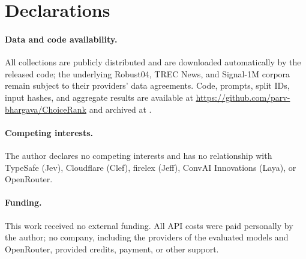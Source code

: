 \section*{Declarations}

\paragraph{Data and code availability.}
All collections are publicly distributed and are downloaded automatically by the released code; the underlying Robust04, TREC News, and Signal-1M corpora remain subject to their providers' data agreements. Code, prompts, split IDs, input hashes, and aggregate results are available at \url{https://github.com/parv-bhargava/ChoiceRank} and archived at .

\paragraph{Competing interests.}
The author declares no competing interests and has no relationship with TypeSafe (Jev), Cloudflare (Clef), firelex (Jeff), ConvAI Innovations (Laya), or OpenRouter.

\paragraph{Funding.}
This work received no external funding. All API costs were paid personally by the author; no company, including the providers of the evaluated models and OpenRouter, provided credits, payment, or other support.
